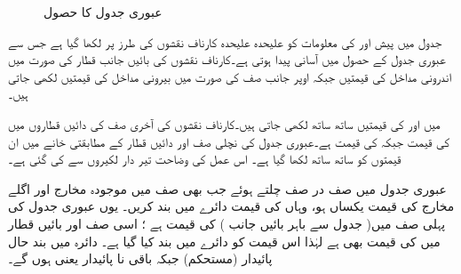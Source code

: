 \begin{figure}
\caption{عبوری جدول کا حصول}
\label{شکل_غیر_معاصر_عبوری_جدول_حصول}
\end{figure}


جدول  میں پیش   اور  کی معلومات کو علیحدہ علیحدہ کارناف نقشوں کی طرز پر لکھا گیا ہے جس سے عبوری جدول کے حصول میں آسانی پیدا ہوتی ہے۔کارناف نقشوں کی بائیں جانب قطار کی صورت میں اندرونی مداخل  کی قیمتیں جبکہ اوپر جانب صف کی صورت میں بیرونی مداخل  کی قیمتیں لکھی جاتی ہیں۔

 میں  اور  کی قیمتیں ساتھ ساتھ  لکھی جاتی ہیں۔کارناف نقشوں کی آخری صف  کی دائیں قطاروں میں  کی قیمت  جبکہ  کی قیمت  ہے۔عبوری جدول کی نچلی صف اور دائیں قطار کے مطابقتی  خانے میں ان قیمتوں کو ساتھ ساتھ  لکھا گیا ہے۔ اس عمل کی وضاحت  تیر دار  لکیروں سے کی گئی ہے۔

عبوری جدول میں صف در صف چلتے ہوئے جب بھی صف میں موجودہ مخارج  اور اگلے مخارج  کی قیمت یکساں ہو، وہاں   کی قیمت دائرے میں بند کریں۔ یوں عبوری جدول کی پہلی صف میں(  جدول سے باہر بائیں  جانب )  کی قیمت  ہے  ؛ اسی صف  اور  بائیں قطار میں  کی قیمت بھی  ہے لہٰذا اس قیمت کو دائرے میں  بند کیا  گیا ہے۔ دائرہ میں بند حال پائیدار (مستحکم) جبکہ باقی نا پائیدار یعنی   ہوں گے۔ 

